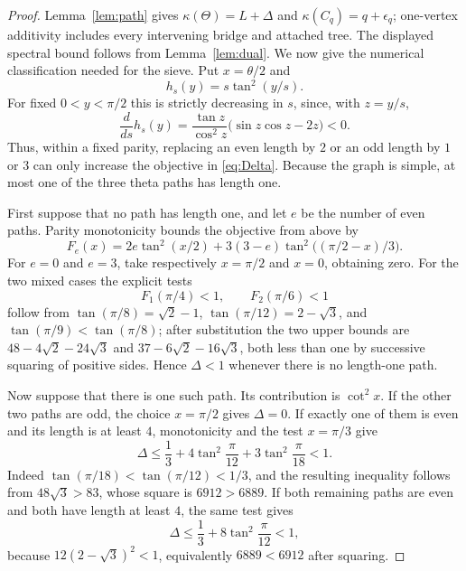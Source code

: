 \documentclass[11pt]{article}
\theoremstyle{remark}
\begin{document}
\begin{proof}
Lemma~\ref{lem:path} gives $\kappa(\Theta)=L+\Delta$ and
$\kappa(C_q)=q+\epsilon_q$; one-vertex additivity includes every intervening
bridge and attached tree.  The displayed spectral bound follows from
Lemma~\ref{lem:dual}.  We now give the numerical classification needed for
the sieve.  Put $x=\theta/2$ and
\[
 h_s(y)=s\tan^2(y/s).
\]
For fixed $0<y<\pi/2$ this is strictly decreasing in $s$, since, with
$z=y/s$,
\begin{equation}\label{eq:hs-derivative}
 \frac{d}{ds}h_s(y)
 =\frac{\tan z}{\cos^2z}\bigl(\sin z\cos z-2z\bigr)<0.
\end{equation}
Thus, within a fixed parity, replacing an even length by $2$ or an odd
length by $1$ or $3$ can only increase the objective in
\eqref{eq:Delta}.  Because the graph is simple, at most one of the three
theta paths has length one.

First suppose that no path has length one, and let $e$ be the number of even
paths.  Parity monotonicity bounds the objective from above by
\[
 F_e(x)=2e\tan^2(x/2)+3(3-e)
             \tan^2\bigl((\pi/2-x)/3\bigr).
\]
For $e=0$ and $e=3$, take respectively $x=\pi/2$ and $x=0$, obtaining zero.
For the two mixed cases the explicit tests
\[
 F_1(\pi/4)<1,
 \qquad F_2(\pi/6)<1
\]
follow from $\tan(\pi/8)=\sqrt2-1$,
$\tan(\pi/12)=2-\sqrt3$, and
$\tan(\pi/9)<\tan(\pi/8)$; after substitution the two upper bounds are
$48-4\sqrt2-24\sqrt3$ and $37-6\sqrt2-16\sqrt3$, both less than one by
successive squaring of positive sides.  Hence $\Delta<1$ whenever there is
no length-one path.

Now suppose that there is one such path.  Its contribution is $\cot^2x$.
If the other two paths are odd, the choice $x=\pi/2$ gives $\Delta=0$.
If exactly one of them is even and its length is at least $4$, monotonicity
and the test $x=\pi/3$ give
\begin{equation}\label{eq:one-unit-mixed-test}
 \Delta\leq \frac13+4\tan^2\frac{\pi}{12}
                    +3\tan^2\frac{\pi}{18}<1.
\end{equation}
Indeed $\tan(\pi/18)<\tan(\pi/12)<1/3$, and the resulting inequality follows
from $48\sqrt3>83$, whose square is $6912>6889$.  If both remaining paths
are even and both have length at least $4$, the same test gives
\begin{equation}\label{eq:one-unit-even-test}
 \Delta\leq\frac13+8\tan^2\frac{\pi}{12}<1,
\end{equation}
because $12(2-\sqrt3)^2<1$, equivalently $6889<6912$ after squaring.


\end{proof}
\end{document}
